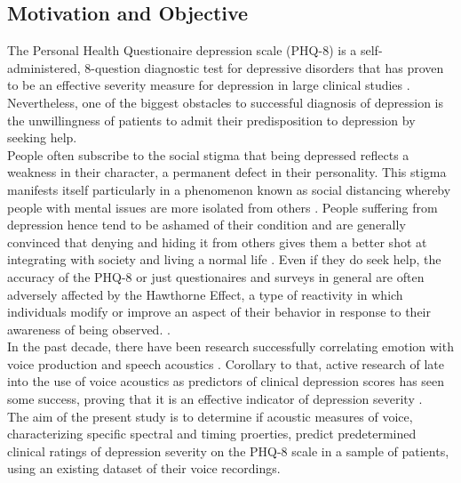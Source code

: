 \documentclass{article}
\begin{document}
	\subsection{Motivation and Objective}
	The Personal Health Questionaire depression scale (PHQ-8) is a self-administered, 8-question diagnostic test for depressive disorders that has proven to be an effective severity measure for depression in large clinical studies \cite{jad2008}. 
	Nevertheless, one of the biggest obstacles to successful diagnosis of depression is the unwillingness of patients to admit their predisposition to depression by seeking help.\\

	People often subscribe to the social stigma that being depressed reflects a weakness in their character, a permanent defect in their personality. 
	This stigma manifests itself particularly in a phenomenon known as social distancing whereby people with mental issues are more isolated from others \cite{tpcrp2011}.  
	People suffering from depression hence tend to be ashamed of their condition and are generally convinced that denying and hiding it from others gives them a better shot at integrating with society and living a normal life \cite{bmb2001}.
	 Even if they do seek help, the accuracy of the PHQ-8 or just questionaires and surveys in general are often adversely affected by the Hawthorne Effect, a type of reactivity in which individuals modify or improve an aspect of their behavior in response to their awareness of being observed. \cite{jce2014}. \\

	In the past decade, there have been research successfully correlating emotion with voice production and speech acoustics \cite{uwa2001}. 
	Corollary to that, active research of late into the use of voice acoustics as predictors of clinical depression scores has seen some success, proving that it is an effective indicator of depression severity \cite{jov2016}. \\

	The aim of the present study is to determine if acoustic measures of voice, characterizing specific spectral and timing proerties, predict predetermined clinical ratings of depression severity on the PHQ-8 scale in a sample of patients, using an existing dataset of their voice recordings. \\
	
\end{document}
